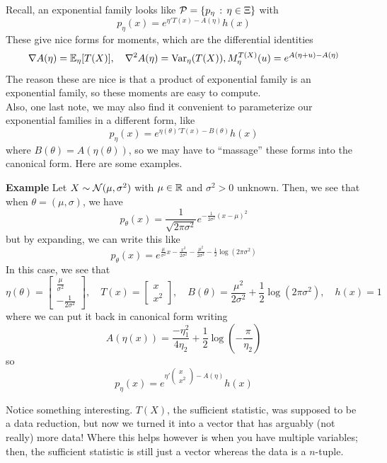 
Recall, an exponential family looks like $\cal{P} = \{p_{\eta} \col \eta \in \Xi\}$ with
\[ p_{\eta}(x) = e^{\eta'T(x) - A(\eta)}h(x) \]
These give nice forms for moments, which are the differential identities
\[ \nabla A(\eta) = \E_{\eta}[T(X)], \quad \nabla^2 A(\eta) = \Var_{\eta}(T(X)), M_{\eta}^{T(X)}(u) = e^{A(\eta + u) - A(\eta)} \]
The reason these are nice is that a product of exponential family is an exponential family, so these moments are easy to compute.\\

Also, one last note, we may also find it convenient to parameterize our exponential families in a different form, like
\[ p_{\eta}(x) = e^{\eta(\theta)'T(x) -B(\theta)}h(x) \]
where $B(\theta) = A(\eta(\theta))$, so we may have to ``massage'' these forms into the canonical form. Here are some examples.

\begin{example}{\textbf{Example}}
    Let $X \sim \cal{N}(\mu, \sigma^2)$ with $\mu \in \R$ and $\sigma^2 > 0$ unknown. Then, we see that when $\theta = (\mu, \sigma)$, we have
    \[ p_{\theta}(x) = \frac{1}{\sqrt{2\pi \sigma^2}}e^{-\frac{1}{2\sigma^2}(x - \mu)^2} \]
    but by expanding, we can write this like
    \[ p_{\theta}(x) = e^{\frac{\mu}{\sigma^2}x - \frac{x^2}{2\sigma^2} - \frac{\mu^2}{2\sigma^2} - \frac{1}{2}\log(2\pi \sigma^2)} \]
    In this case, we see that
    \[ \eta(\theta) = \begin{bmatrix} \frac{\mu}{\sigma^2} \\ -\frac{1}{2\sigma^2}\end{bmatrix}, \quad T(x) = \begin{bmatrix} x \\ x^2 \end{bmatrix}, \quad B(\theta) = \frac{\mu^2}{2\sigma^2} + \frac{1}{2}\log(2\pi\sigma^2), \quad h(x) = 1 \]
    where we can put it back in canonical form writing
    \[ A(\eta(x)) = \frac{-\eta_1^2}{4\eta_2} + \frac{1}{2}\log(-\frac{\pi}{\eta_2}) \]
    so
    \[ p_{\eta}(x) = e^{\eta'\begin{pmatrix} x \\ x^2\end{pmatrix} - A(\eta)}h(x) \]

    Notice something interesting. $T(X)$, the sufficient statistic, was supposed to be a data reduction, but now we turned it into a vector that has arguably (not really) more data! Where this helps however is when you have multiple variables; then, the sufficient statistic is still just a vector whereas the data is a $n$-tuple. 
\end{example}

